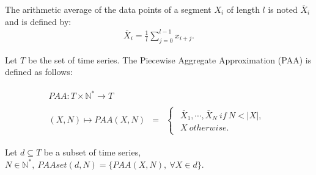 \begin{definition}
The arithmetic average of the data points of a segment  $X_{i}$ of length
$l$ is noted $\bar{X}_{i}$ and is defined by:
\begin{eqnarray}
\bar{X}_{i}=\frac{1}{l}\sum_{j=0}^{l-1}x_{i+j}.
\end{eqnarray}
\end{definition}


\begin{definition}
Let $T$ be the set of time series. The Piecewise Aggregate Approximation (PAA) is defined as follows:

\begin{eqnarray}
\begin{array}{ccc}
 PAA: T\times\mathbb{N^{*}}\rightarrow T\\
\\
(X,N)\mapsto PAA(X,N) & = &
 \begin{cases}
 \begin{array}{c}
\bar{X}_{1},\cdots,\bar{X}_{N}\:if\:N<|X|,\\
X\:otherwise.
\end{array}
\end{cases}
\end{array}
\end{eqnarray}
\end{definition}

\begin{definition}
Let $d\subseteq T$ be a subset of time series,
$N\in\mathbb{N}^{*},\:PAAset(d,N)=\{PAA(X,N),\:\forall X\in d\}.$
\end{definition}


